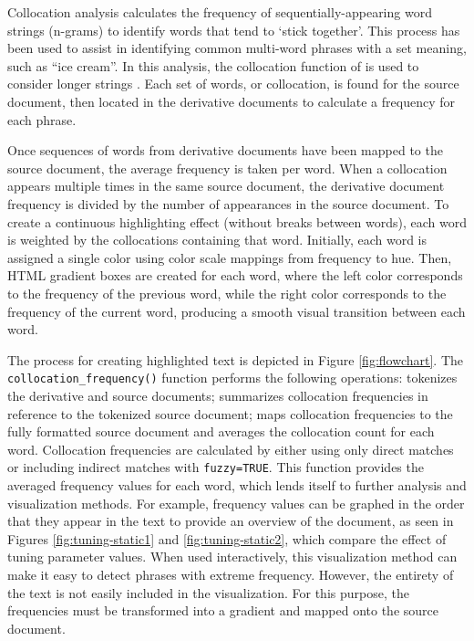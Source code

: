 Collocation analysis calculates the frequency of sequentially-appearing word strings (n-grams) to identify words that tend to `stick together'.
This process has been used to assist in identifying common multi-word phrases with a set meaning, such as ``ice cream''.
In this analysis, the collocation function of  \citep{quanteda} is used to consider longer strings \citep{schweinberger}.
Each set of words, or collocation, is found for the source document, then located in the derivative documents to calculate a frequency for each phrase.

Once sequences of words from derivative documents have been mapped to the source document, the average frequency is taken per word.
When a collocation appears multiple times in the same source document, the derivative document frequency is divided by the number of appearances in the source document.
To create a continuous highlighting effect (without breaks between words), each word is weighted by the collocations containing that word.
Initially, each word is assigned a single color using  color scale mappings from frequency to hue.
Then, HTML gradient boxes are created for each word, where the left color corresponds to the frequency of the previous word, while the right color corresponds to the frequency of the current word, producing a smooth visual transition between each word.

The process for creating highlighted text is depicted in Figure \ref{fig:flowchart}.
The \texttt{collocation\_frequency()} function performs the following operations: tokenizes the derivative and source documents; summarizes collocation frequencies in reference to the tokenized source document; maps collocation frequencies to the fully formatted source document and averages the collocation count for each word.
Collocation frequencies are calculated by either using only direct matches or including indirect matches with \texttt{fuzzy=TRUE}.
This function provides the averaged frequency values for each word, which lends itself to further analysis and visualization methods.
For example, frequency values can be graphed in the order that they appear in the text to provide an overview of the document, as seen in Figures \ref{fig:tuning-static1} and \ref{fig:tuning-static2}, which compare the effect of tuning parameter values.
When used interactively, this visualization method can make it easy to detect phrases with extreme frequency.
However, the entirety of the text is not easily included in the visualization.
For this purpose, the frequencies must be transformed into a gradient and mapped onto the source document.

